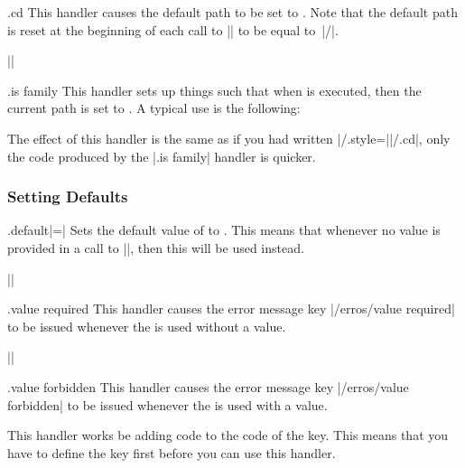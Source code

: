 \begin{handler}{{.cd}}
  This handler causes the default path to be set to . Note that
  the default path is reset at the beginning of each call to
  |\pgfkeys| to be equal to~|/|.

  \example ||
\end{handler}

\begin{handler}{{.is family}}
\label{section-is family-handler}
  This handler sets up things such that when  is executed, then
  the current path is set to . A typical use is the following:
\begin{codeexample}
\end{codeexample}
  The effect of this handler is the same as if you had written
  |/.style=||/.cd|, only the code produced by the
  |.is family| handler is quicker.
\end{handler}


\subsubsection{Setting Defaults}
\label{section-default-handlers}

\begin{handler}{{.default}|=|}
  Sets the default value of  to . This means
  that whenever no value is provided in a call to |\pgfkeys|, then
  this  will be used instead.

  \example ||
\end{handler}

\begin{handler}{{.value required}}
  This handler causes the error message key |/erros/value required| to
  be issued whenever the  is used without a value.

  \example ||
\end{handler}

\begin{handler}{{.value forbidden}}
  This handler causes the error message key |/erros/value forbidden|
  to be issued whenever the  is used with a value.

  This handler works be adding code to the code of the key. This means
  that you have to define the key first before you can use this
  handler. 
\begin{codeexample}

\end{codeexample}
\end{handler}


